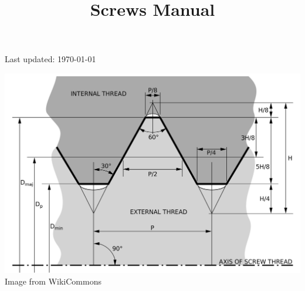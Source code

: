 \documentclass{article}
\title{\vspace{-2cm}Screws Manual}
\date{}
\begin{document}
\begin{landscape}
\maketitle

\vspace{-1cm}

Last updated: \today


\begin{center}
\includegraphics[width=20cm]{assets/screws.png}\\
Image from WikiCommons
%
\end{center}
\end{landscape}
\end{document}
